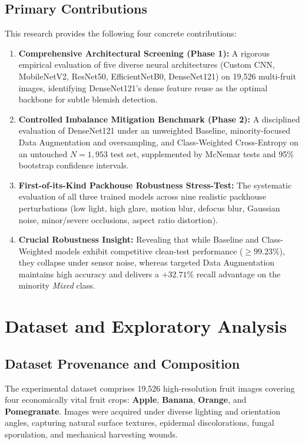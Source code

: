 \documentclass[conference]{IEEEtran}
\begin{document}
\subsection{Primary Contributions}
This research provides the following four concrete contributions:
\begin{enumerate}
    \item \textbf{Comprehensive Architectural Screening (Phase 1):} A rigorous empirical evaluation of five diverse neural architectures (Custom CNN, MobileNetV2, ResNet50, EfficientNetB0, DenseNet121) on 19,526 multi-fruit images, identifying DenseNet121's dense feature reuse as the optimal backbone for subtle blemish detection.
    \item \textbf{Controlled Imbalance Mitigation Benchmark (Phase 2):} A disciplined evaluation of DenseNet121 under an unweighted Baseline, minority-focused Data Augmentation and oversampling, and Class-Weighted Cross-Entropy on an untouched $N=1,953$ test set, supplemented by McNemar tests and 95\% bootstrap confidence intervals.
    \item \textbf{First-of-its-Kind Packhouse Robustness Stress-Test:} The systematic evaluation of all three trained models across nine realistic packhouse perturbations (low light, high glare, motion blur, defocus blur, Gaussian noise, minor/severe occlusions, aspect ratio distortion).
    \item \textbf{Crucial Robustness Insight:} Revealing that while Baseline and Class-Weighted models exhibit competitive clean-test performance ($\ge 99.23\%$), they collapse under sensor noise, whereas targeted Data Augmentation maintains high accuracy and delivers a $+32.71\%$ recall advantage on the minority \textit{Mixed} class.
\end{enumerate}

\section{Dataset and Exploratory Analysis}
\subsection{Dataset Provenance and Composition}
The experimental dataset comprises 19,526 high-resolution fruit images covering four economically vital fruit crops: \textbf{Apple}, \textbf{Banana}, \textbf{Orange}, and \textbf{Pomegranate}. Images were acquired under diverse lighting and orientation angles, capturing natural surface textures, epidermal discolorations, fungal sporulation, and mechanical harvesting wounds.
\end{document}
